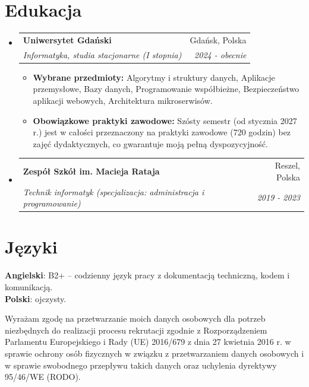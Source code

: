 \documentclass[a4paper,10pt]{article}
\makeatletter
\newcommand{\resumeItem}[1]{
  \item\small{
    {#1 \vspace{-1pt}}
  }
}
\newcommand{\resumeSubheading}[4]{
  \vspace{0pt}\item
    \begin{tabular*}{0.97\textwidth}[t]{l@{\extracolsep{\fill}}r}
      \textbf{#1} & #2 \\
      \textit{\small#3} & \textit{\small #4} \\
    \end{tabular*}\vspace{-2pt}
}
\newcommand{\resumeSubHeadingListStart}{\begin{itemize}[leftmargin=0.15in, label={}, topsep=0pt]}
\newcommand{\resumeSubHeadingListEnd}{\end{itemize}\vspace{0pt}}
\newcommand{\resumeItemListStart}{\begin{itemize}[itemsep=1pt, parsep=0pt, partopsep=0pt, topsep=0pt]}
\newcommand{\resumeItemListEnd}{\end{itemize}\vspace{0pt}}
\makeatother
\begin{document}
\section{Edukacja}
  \resumeSubHeadingListStart
    \resumeSubheading
      {Uniwersytet Gdański}{Gdańsk, Polska}
      {Informatyka, studia stacjonarne (I stopnia)}{2024 - obecnie}
      \resumeItemListStart
        \resumeItem{\textbf{Wybrane przedmioty:} Algorytmy i struktury danych, Aplikacje przemysłowe, Bazy danych, Programowanie współbieżne, Bezpieczeństwo aplikacji webowych, Architektura mikroserwisów.}
        \resumeItem{\vspace{4pt}\textbf{Obowiązkowe praktyki zawodowe:} Szósty semestr (od stycznia 2027 r.) jest w całości przeznaczony na praktyki zawodowe (720 godzin) bez zajęć dydaktycznych, co gwarantuje moją pełną dyspozycyjność.}
      \resumeItemListEnd
    \resumeSubheading
      {Zespół Szkół im. Macieja Rataja}{Reszel, Polska}
      {Technik informatyk (specjalizacja: administracja i programowanie)}{2019 - 2023}
  \resumeSubHeadingListEnd

\section{Języki}
 \begin{itemize}[leftmargin=0.15in, label={}, topsep=0pt]
    \small{\item{
     \textbf{Angielski}{: B2+ -- codzienny język pracy z dokumentacją techniczną, kodem i komunikacją.} \\
     \textbf{Polski}{: ojczysty.}
    }}
 \end{itemize}

\vfill
\begin{center}
  \tiny \color{LightGray} Wyrażam zgodę na przetwarzanie moich danych osobowych dla potrzeb niezbędnych do realizacji procesu rekrutacji zgodnie z Rozporządzeniem Parlamentu Europejskiego i Rady (UE) 2016/679 z dnia 27 kwietnia 2016 r. w sprawie ochrony osób fizycznych w związku z przetwarzaniem danych osobowych i w sprawie swobodnego przepływu takich danych oraz uchylenia dyrektywy 95/46/WE (RODO).
\end{center}
\end{document}
